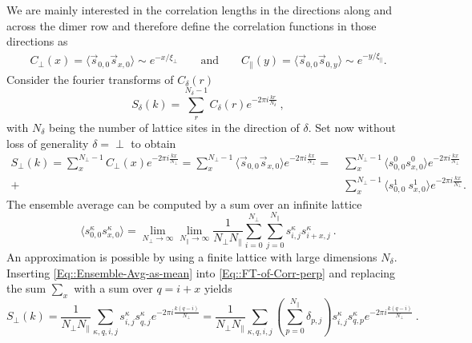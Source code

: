 	We are mainly interested in the correlation lengths in the directions along and across the dimer row and therefore define the correlation functions in those directions as
	\begin{align} \label{Eq::Corr-Func-asymptotic}
		C_\perp(x) =  \langle \vec{s}_{0,0} \vec{s}_{x, 0} \rangle \sim e^{-x /	\xi_\perp} \qquad \text{and} \qquad
		C_\parallel(y) =  \langle \vec{s}_{0,0} \vec{s}_{0, y} \rangle \sim e^{-y /	\xi_\parallel}.
	\end{align}
	Consider the fourier transforms of $C_\delta(r)$
	\begin{equation}  \label{Eq::FT-Corr-delta}
		S_\delta(k) = \sum_r^{N_\delta - 1} C_\delta (r) e^{-2\pi i \frac{kr}{N_\delta}}~,
	\end{equation}
	with $N_\delta$ being the number of lattice sites in the direction of $\delta$. Set now without loss of generality $\delta =	\perp$ to obtain
	\begin{equation} \label{Eq::FT-of-Corr-perp}
		\begin{split}
			S_\perp(k) = \sum_x^{N_\perp - 1} C_\perp (x) e^{-2\pi i \frac{kx}{N_\perp}} =\sum_x^{N_\perp - 1} \langle \vec{s}_{0,0} \vec{s}_{x, 0} \rangle e^{-2\pi i \frac{kx}{N_\perp}} = ~&\sum_x^{N_\perp - 1} \langle s^0_{0,0} s_{x, 0}^0 \rangle e^{-2\pi i \frac{kx}{N_\perp}} \\
			+&\sum_x^{N_\perp - 1} \langle s_{0,0}^1  \
			s_{x, 0}^1 \rangle e^{-2\pi i \frac{kx}{N_\perp}}.
		\end{split}
	\end{equation}
	The ensemble average can be computed by a sum over an infinite lattice
	\begin{equation} \label{Eq::Ensemble-Avg-as-mean}
		\langle s^\kappa_{0,0} s_{x, 0}^\kappa \rangle =	\lim\limits_{N_\perp \rightarrow \infty} \lim\limits_{N_\parallel \rightarrow \infty} \frac{1}{N_\perp N_\parallel} \sum_{i =	0}^{N_\perp} \sum_{j=0}^{N_\parallel}   s^\kappa_{i,j} s_{i + x, j}^\kappa~.
	\end{equation}
	An approximation is possible by using a finite lattice with large dimensions $N_\delta$. Inserting \autoref{Eq::Ensemble-Avg-as-mean} into \autoref{Eq::FT-of-Corr-perp} and replacing the sum $\sum_x$ with a sum over $q =	i +x$ yields
	\begin{equation} \label{Eq::FT-Corr-Delta}
		S_\perp(k) = \frac{1}{N_\perp N_\parallel}  \sum_{\kappa,q,i,j}^{}   s^\kappa_{i,j} s_{q, j}^\kappa e^{-2\pi i \frac{k(q-i)}{N_\perp}} =	\frac{1}{N_\perp N_\parallel}  \sum_{\kappa,q,i,j}^{}  \left(\sum_{p=0}^{N_\parallel} \delta_{p,j} \right) s^\kappa_{i,j} s_{q, p}^\kappa e^{-2\pi i \frac{k(q-i)}{N_\perp}}~.
	\end{equation}
